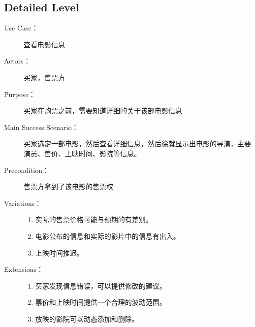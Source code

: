 \documentclass[a4paper]{article}
\begin{document}
  \subsection*{Detailed Level}
  \begin{description}
    \item[Use Case：] 查看电影信息
    \item[Actors：] 买家，售票方
    \item[Purpose：] 买家在购票之前，需要知道详细的关于该部电影信息
    \item[Main Success Scenario：] 买家选定一部电影，然后查看详细信息，然后徐就显示出电影的导演，主要演员、售价、上映时间、影院等信息。
    \item[Precondition：] 售票方拿到了该电影的售票权
    \item[Variations：]
    \begin{enumerate}
      \item 实际的售票价格可能与预期的有差别。
      \item 电影公布的信息和实际的影片中的信息有出入。
      \item 上映时间推迟。
    \end{enumerate}
    \item[Extensions：]
    \begin{enumerate}
      \item 买家发现信息错误，可以提供修改的建议。
      \item 票价和上映时间提供一个合理的波动范围。 
      \item 放映的影院可以动态添加和删除。
    \end{enumerate}
  \end{description}
\end{document}
